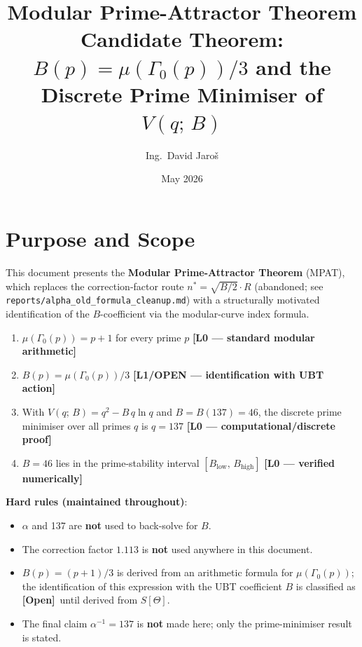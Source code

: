 \documentclass[12pt,a4paper]{article}
\title{\textbf{Modular Prime-Attractor Theorem}\\
         \large Candidate Theorem: $B(p) = \mu(\Gamma_0(p))/3$ and the Discrete
         Prime Minimiser of $V(q;\,B)$}
\author{Ing.\ David Jaro\v{s}}
\date{May 2026}
\theoremstyle{definition}
\theoremstyle{remark}
\newcommand{\OPEN}{\textbf{[Open]}}
\begin{document}
  \maketitle
  \tableofcontents
  \newpage
\fi

\section{Purpose and Scope}
\label{sec:mpat:purpose}

This document presents the \textbf{Modular Prime-Attractor Theorem} (MPAT), which
replaces the correction-factor route $n^* = \sqrt{B/2} \cdot R$ (abandoned; see
\texttt{reports/alpha\_old\_formula\_cleanup.md}) with a structurally motivated
identification of the $B$-coefficient via the modular-curve index formula.

\begin{tcolorbox}[colback=blue!4!white,colframe=blue!50!black,
  title=Central Claim of the Modular Prime-Attractor Route]
\begin{enumerate}
  \item $\mu(\Gamma_0(p)) = p + 1$ for every prime $p$ \quad\textbf{[L0 — standard modular arithmetic]}
  \item $B(p) = \mu(\Gamma_0(p))/3$ \quad\textbf{[L1/OPEN — identification with UBT action]}
  \item With $V(q;\,B) = q^2 - B\,q\ln q$ and $B = B(137) = 46$, the discrete prime
        minimiser over all primes $q$ is $q = 137$ \quad\textbf{[L0 — computational/discrete proof]}
  \item $B = 46$ lies in the prime-stability interval $[B_{\mathrm{low}},\,B_{\mathrm{high}}]$
        \quad\textbf{[L0 — verified numerically]}
\end{enumerate}
\end{tcolorbox}

\begin{warnbox}
\textbf{Hard rules (maintained throughout)}:
\begin{itemize}
  \item $\alpha$ and 137 are \textbf{not} used to back-solve for $B$.
  \item The correction factor $1.113$ is \textbf{not} used anywhere in this document.
  \item $B(p) = (p+1)/3$ is derived from an arithmetic formula for $\mu(\Gamma_0(p))$;
        the identification of this expression with the UBT coefficient $B$ is
        classified as \OPEN\ until derived from $S[\Theta]$.
  \item The final claim $\alpha^{-1} = 137$ is \textbf{not} made here; only the
        prime-minimiser result is stated.
\end{itemize}
\end{warnbox}
\end{document}
